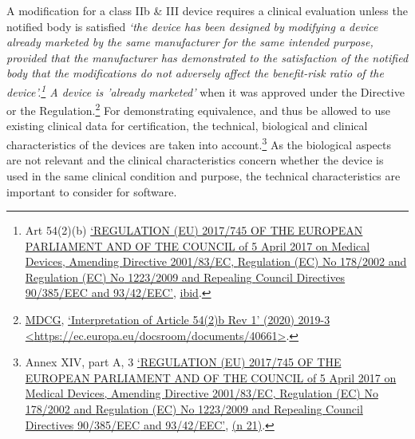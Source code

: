 \documentclass[
]{scrartcl}
\begin{document}
A modification for a class IIb \& III device requires a clinical evaluation unless the notified body is satisfied \emph{`the device has been designed by modifying a device already marketed by the same manufacturer for the same intended purpose, provided that the manufacturer has demonstrated to the satisfaction of the notified body that the modifications do not adversely affect the benefit-risk ratio of the device\emph{'.\footnote{Art 54(2)(b) \protect\hyperlink{ref-REGULATIONEU2017a}{{`{REGULATION} ({EU}) 2017/745 {OF THE EUROPEAN PARLIAMENT AND OF THE COUNCIL} of 5 {April} 2017 on Medical Devices, Amending {Directive} 2001/83/{EC}, {Regulation} ({EC}) {No} 178/2002 and {Regulation} ({EC}) {No} 1223/2009 and Repealing {Council Directives} 90/385/{EEC} and 93/42/{EEC}'}}, \protect\hyperlink{ref-REGULATIONEU2017a}{ibid}.} A device is '}already marketed'} when it was approved under the Directive or the Regulation.\footnote{\protect\hyperlink{ref-mdcgInterpretationArticle542020}{MDCG}, \protect\hyperlink{ref-mdcgInterpretationArticle542020}{{`Interpretation of {Article} 54(2)b Rev 1'} (2020) 2019-3 \textless{}\url{https://ec.europa.eu/docsroom/documents/40661}\textgreater{}}.} For demonstrating equivalence, and thus be allowed to use existing clinical data for certification, the technical, biological and clinical characteristics of the devices are taken into account.\footnote{Annex XIV, part A, 3 \protect\hyperlink{ref-REGULATIONEU2017a}{{`{REGULATION} ({EU}) 2017/745 {OF THE EUROPEAN PARLIAMENT AND OF THE COUNCIL} of 5 {April} 2017 on Medical Devices, Amending {Directive} 2001/83/{EC}, {Regulation} ({EC}) {No} 178/2002 and {Regulation} ({EC}) {No} 1223/2009 and Repealing {Council Directives} 90/385/{EEC} and 93/42/{EEC}'}}, \protect\hyperlink{ref-REGULATIONEU2017a}{(n 21)}.} As the biological aspects are not relevant and the clinical characteristics concern whether the device is used in the same clinical condition and purpose, the technical characteristics are important to consider for software.
\end{document}
